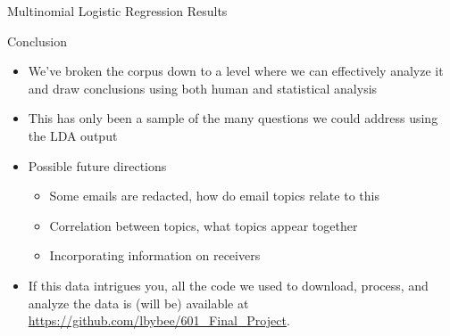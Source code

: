 \documentclass[handout,13pt]{beamer}
\begin{document}
\begin{frame}{Multinomial Logistic Regression Results}
\begin{table}[h]
\centering
\label{multinomial_results}
\end{table}
\end{frame}


\begin{frame}{Conclusion}
\begin{itemize}
\item We've broken the corpus down to a level where we can effectively analyze it and draw conclusions using both human and statistical analysis
\item This has only been a sample of the many questions we could address using the LDA output
\item Possible future directions
  \begin{itemize}
  \item Some emails are redacted, how do email topics relate to this
  \item Correlation between topics, what topics appear together
  \item Incorporating information on receivers
  \end{itemize}
\item If this data intrigues you, all the code we used to download, process, and analyze the data is (will be) available at \url{https://github.com/lbybee/601_Final_Project}.
\end{itemize}
\end{frame}
\end{document}
